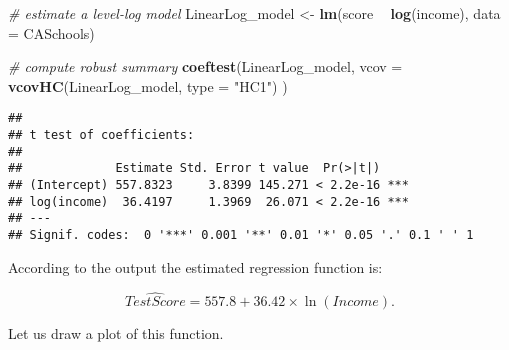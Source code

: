\documentclass[]{book}
\newenvironment{Shaded}{\begin{snugshade}}{\end{snugshade}}
\newcommand{\KeywordTok}[1]{\textcolor[rgb]{0.13,0.29,0.53}{\textbf{#1}}}
\newcommand{\DataTypeTok}[1]{\textcolor[rgb]{0.13,0.29,0.53}{#1}}
\newcommand{\DecValTok}[1]{\textcolor[rgb]{0.00,0.00,0.81}{#1}}
\newcommand{\StringTok}[1]{\textcolor[rgb]{0.31,0.60,0.02}{#1}}
\newcommand{\CommentTok}[1]{\textcolor[rgb]{0.56,0.35,0.01}{\textit{#1}}}
\newcommand{\OperatorTok}[1]{\textcolor[rgb]{0.81,0.36,0.00}{\textbf{#1}}}
\newcommand{\NormalTok}[1]{#1}
\theoremstyle{definition}
\theoremstyle{definition}
\theoremstyle{definition}
\theoremstyle{remark}
\begin{document}
\begin{Shaded}
\begin{Highlighting}[]
\CommentTok{# estimate a level-log model}
\NormalTok{LinearLog_model <-}\StringTok{ }\KeywordTok{lm}\NormalTok{(score }\OperatorTok{~}\StringTok{ }\KeywordTok{log}\NormalTok{(income), }\DataTypeTok{data =}\NormalTok{ CASchools)}

\CommentTok{# compute robust summary}
\KeywordTok{coeftest}\NormalTok{(LinearLog_model, }
         \DataTypeTok{vcov =} \KeywordTok{vcovHC}\NormalTok{(LinearLog_model, }\DataTypeTok{type =} \StringTok{"HC1"}\NormalTok{)}
\NormalTok{         )}
\end{Highlighting}
\end{Shaded}

\begin{verbatim}
## 
## t test of coefficients:
## 
##             Estimate Std. Error t value  Pr(>|t|)    
## (Intercept) 557.8323     3.8399 145.271 < 2.2e-16 ***
## log(income)  36.4197     1.3969  26.071 < 2.2e-16 ***
## ---
## Signif. codes:  0 '***' 0.001 '**' 0.01 '*' 0.05 '.' 0.1 ' ' 1
\end{verbatim}

According to the output the estimated regression function is:

\[\widehat{TestScore} = 557.8 + 36.42 \times \ln(Income).\]

Let us draw a plot of this function.

\begin{Shaded}
\end{Shaded}
\end{document}
